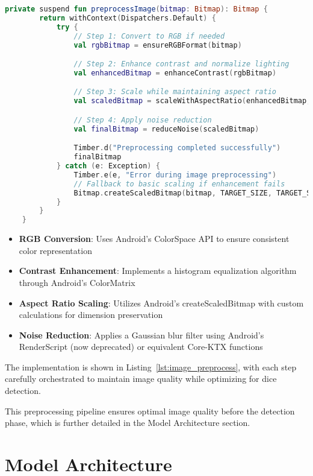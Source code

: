 \begin{lstlisting}[language=Kotlin, caption={Image Preprocessing Pipeline}, label=lst:image_preprocess]
    private suspend fun preprocessImage(bitmap: Bitmap): Bitmap {
        return withContext(Dispatchers.Default) {
            try {
                // Step 1: Convert to RGB if needed
                val rgbBitmap = ensureRGBFormat(bitmap)

                // Step 2: Enhance contrast and normalize lighting
                val enhancedBitmap = enhanceContrast(rgbBitmap)

                // Step 3: Scale while maintaining aspect ratio
                val scaledBitmap = scaleWithAspectRatio(enhancedBitmap, TARGET_SIZE)

                // Step 4: Apply noise reduction
                val finalBitmap = reduceNoise(scaledBitmap)

                Timber.d("Preprocessing completed successfully")
                finalBitmap
            } catch (e: Exception) {
                Timber.e(e, "Error during image preprocessing")
                // Fallback to basic scaling if enhancement fails
                Bitmap.createScaledBitmap(bitmap, TARGET_SIZE, TARGET_SIZE, true)
            }
        }
    }
\end{lstlisting}
\begin{itemize}
    \item \textbf{RGB Conversion}: Uses Android's ColorSpace API to ensure consistent color representation
    \item \textbf{Contrast Enhancement}: Implements a histogram equalization algorithm through Android's ColorMatrix
    \item \textbf{Aspect Ratio Scaling}: Utilizes Android's createScaledBitmap with custom calculations for dimension preservation
    \item \textbf{Noise Reduction}: Applies a Gaussian blur filter using Android's RenderScript (now deprecated) or equivalent Core-KTX functions
\end{itemize}

The implementation is shown in Listing~\ref{lst:image_preprocess}, with each step carefully orchestrated to maintain image quality while optimizing for dice detection.

This preprocessing pipeline ensures optimal image quality before the detection phase, which is further detailed in the Model Architecture section.

\section{Model Architecture}


